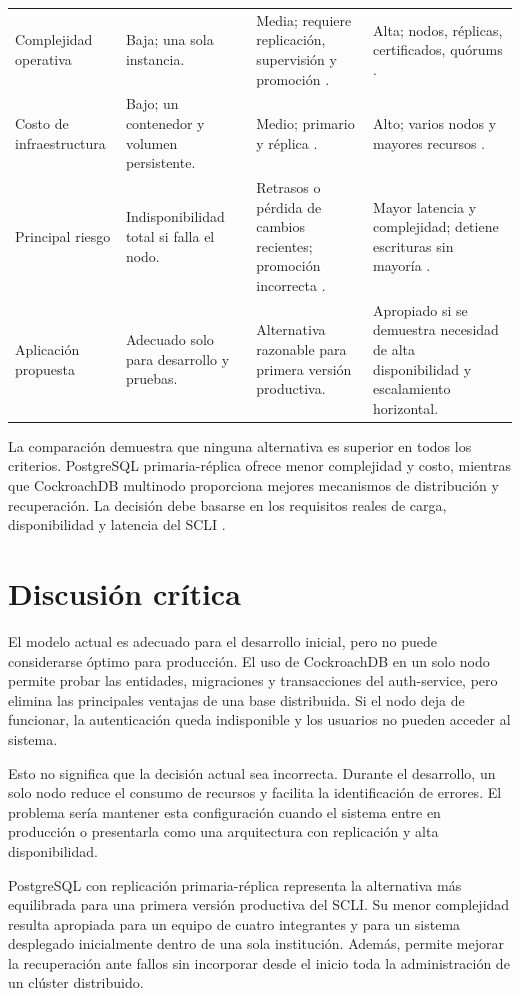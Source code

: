 \documentclass[conference]{IEEEtran}
\begin{document}
\begin{table}[htbp]
\begin{tabular}{p{2.1cm}p{4.2cm}p{4.2cm}p{4.2cm}}
Complejidad operativa & Baja; una sola instancia. & Media; requiere replicación, supervisión y promoción \cite{ref12}. & Alta; nodos, réplicas, certificados, quórums \cite{ref13}. \\
Costo de infraestructura & Bajo; un contenedor y volumen persistente. & Medio; primario y réplica \cite{ref12}. & Alto; varios nodos y mayores recursos \cite{ref12,ref13}. \\
Principal riesgo & Indisponibilidad total si falla el nodo. & Retrasos o pérdida de cambios recientes; promoción incorrecta \cite{ref1,ref12}. & Mayor latencia y complejidad; detiene escrituras sin mayoría \cite{ref12,ref13}. \\
Aplicación propuesta & Adecuado solo para desarrollo y pruebas. & Alternativa razonable para primera versión productiva. & Apropiado si se demuestra necesidad de alta disponibilidad y escalamiento horizontal. \\
\bottomrule
\end{tabular}
\end{table}

La comparación demuestra que ninguna alternativa es superior en todos los criterios. PostgreSQL primaria-réplica ofrece menor complejidad y costo, mientras que CockroachDB multinodo proporciona mejores mecanismos de distribución y recuperación. La decisión debe basarse en los requisitos reales de carga, disponibilidad y latencia del SCLI \cite{ref12,ref13}.

\section{Discusión crítica}
El modelo actual es adecuado para el desarrollo inicial, pero no puede considerarse óptimo para producción. El uso de CockroachDB en un solo nodo permite probar las entidades, migraciones y transacciones del auth-service, pero elimina las principales ventajas de una base distribuida. Si el nodo deja de funcionar, la autenticación queda indisponible y los usuarios no pueden acceder al sistema.

Esto no significa que la decisión actual sea incorrecta. Durante el desarrollo, un solo nodo reduce el consumo de recursos y facilita la identificación de errores. El problema sería mantener esta configuración cuando el sistema entre en producción o presentarla como una arquitectura con replicación y alta disponibilidad.

PostgreSQL con replicación primaria-réplica representa la alternativa más equilibrada para una primera versión productiva del SCLI. Su menor complejidad resulta apropiada para un equipo de cuatro integrantes y para un sistema desplegado inicialmente dentro de una sola institución. Además, permite mejorar la recuperación ante fallos sin incorporar desde el inicio toda la administración de un clúster distribuido.
\end{document}

